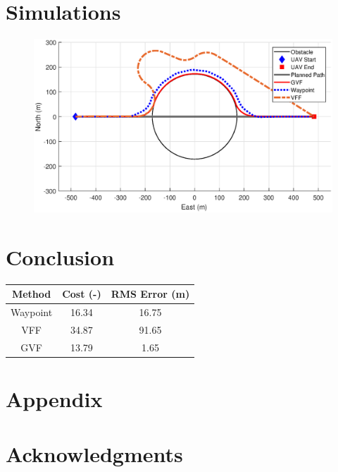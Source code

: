 \documentclass[conf]{new-aiaa}
\begin{document}
\section{Simulations}
\begin{figure}
	\centering
	\includegraphics[width=0.7\linewidth]{Figures/Simulations/compareMethods}
	\caption{}
	\label{fig:comparemethods}
\end{figure}





\section{Conclusion}


\begin{tabular}{|c|c|c|}
	\hline 
	Method & Cost (-) & RMS Error (m) \\ 
	\hline 
	Waypoint & 16.34 & 16.75 \\ 
	\hline 
	VFF & 34.87 & 91.65 \\ 
	\hline 
	GVF & 13.79 & 1.65 \\ 
	\hline 
\end{tabular} 
\section*{Appendix}



\section*{Acknowledgments}


\end{document}
